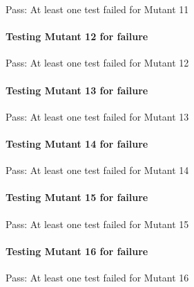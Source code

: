 \begin{DoxyItemize}
\item Pass\+: At least one test failed for Mutant 11
\end{DoxyItemize}

\paragraph*{Testing Mutant 12 for failure}


\begin{DoxyItemize}
\item Pass\+: At least one test failed for Mutant 12
\end{DoxyItemize}

\paragraph*{Testing Mutant 13 for failure}


\begin{DoxyItemize}
\item Pass\+: At least one test failed for Mutant 13
\end{DoxyItemize}

\paragraph*{Testing Mutant 14 for failure}


\begin{DoxyItemize}
\item Pass\+: At least one test failed for Mutant 14
\end{DoxyItemize}

\paragraph*{Testing Mutant 15 for failure}


\begin{DoxyItemize}
\item Pass\+: At least one test failed for Mutant 15
\end{DoxyItemize}

\paragraph*{Testing Mutant 16 for failure}


\begin{DoxyItemize}
\item Pass\+: At least one test failed for Mutant 16
\end{DoxyItemize}

